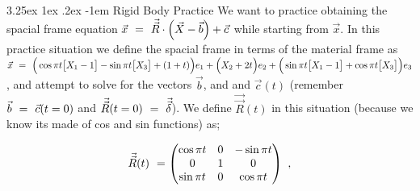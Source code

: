 \documentclass{article}
\makeatletter
\renewcommand\subparagraph{\@startsection{subparagraph}{6}{\parindent}%
  {3.25ex \@plus1ex \@minus .2ex}%
  {-1em}%
  {\normalfont\normalsize\bfseries}}
\makeatother
\begin{document}
\subparagraph{Rigid Body Practice}
We want to practice obtaining the spacial frame equation \begin{math} \vec{x} \hspace{0.125cm} = \hspace{0.125cm} \vec{\vec{R}} \cdot \Big( \vec{X} - \vec{b} \Big) + \vec{c} \end{math} while starting from \begin{math} \vec{x} \end{math}. In this practice situation we define the spacial frame in terms of the material frame as \begin{math} \vec{x} \hspace{0.125cm} = \hspace{0.125cm}  \Big( \cos \pi t  \big[ X_1 - 1 \big] - \sin \pi t \big[ X_3 \big] + (1 + t) \Big) e_1 +  \Big( X_2 + 2 t \Big) e_2 + \Big( \sin \pi t \big[ X_1 - 1 \big] + \cos \pi t \big[ X_3 \big] \Big) e_3 \end{math}, and attempt to solve for the vectors \begin{math} \vec{b} \end{math}, and and \begin{math} \vec{c}( t ) \end{math} (remember \begin{math} \vec{b} \hspace{0.125cm} = \hspace{0.125cm} \vec{c}( t = 0 ) \end{math} and \begin{math} \vec{\vec{R}}( t = 0 ) \hspace{0.125cm} = \hspace{0.125cm} \vec{\vec{\delta}} \end{math}). We define \begin{math} \vec{\vec{R}}( t ) \end{math} in this situation (because we know its made of cos and sin functions) as;

\begin{equation} \label{eb-eq-1-59}
\vec{\vec{R}}( t ) \hspace{0.125cm} = \begin{pmatrix} \cos \pi t & 0 & - \sin \pi t \\ 0 & 1 & 0 \\ \sin \pi t & 0 & \cos \pi t \end{pmatrix} \hspace{0.125cm} ,
\end{equation} 
\end{document}
